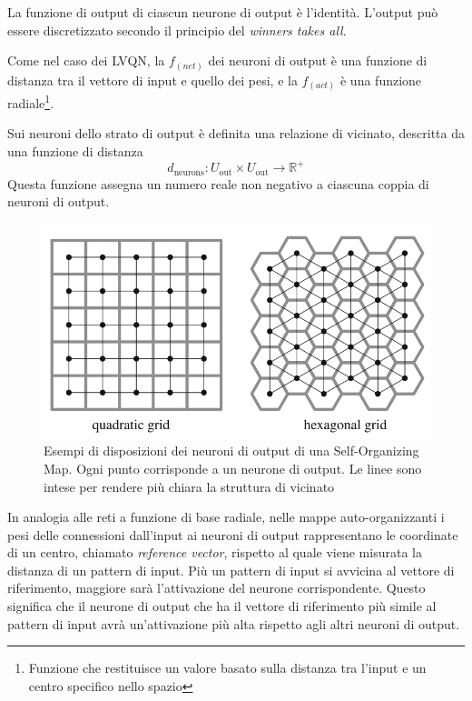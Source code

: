 La funzione di output di ciascun neurone di output è l'identità. L'output può essere discretizzato secondo il principio del \textit{winners takes all}.

Come nel caso dei LVQN, la $f_{(net)}$ dei neuroni di output è una funzione di distanza tra il vettore di input e quello dei pesi, e la $f_{(act)}$ è una funzione radiale\footnote{Funzione che restituisce un valore basato sulla distanza tra l'input e un centro specifico nello spazio}.

Sui neuroni dello strato di output è definita una relazione di vicinato, descritta da una funzione di distanza
$$d_{\text{neurons}} : U_{\text{out}} \times U_{\text{out}} \rightarrow \mathbb{R}^{+}$$
Questa funzione assegna un numero reale non negativo a ciascuna coppia di neuroni di output.

\begin{figure}[h]
    \centering
    \includegraphics[scale=0.4]{images/som-structure.png}
    \caption{Esempi di disposizioni dei neuroni di output di una Self-Organizing Map. Ogni punto corrisponde a un neurone di output. Le linee sono intese per rendere più chiara la struttura di vicinato}
\end{figure}

In analogia alle reti a funzione di base radiale, nelle mappe auto-organizzanti i pesi delle connessioni dall'input ai neuroni di output rappresentano le coordinate di un centro, chiamato \textit{reference vector}, rispetto al quale viene misurata la distanza di un pattern di input. Più un pattern di input si avvicina al vettore di riferimento, maggiore sarà l'attivazione del neurone corrispondente. Questo significa che il neurone di output che ha il vettore di riferimento più simile al pattern di input avrà un'attivazione più alta rispetto agli altri neuroni di output.

